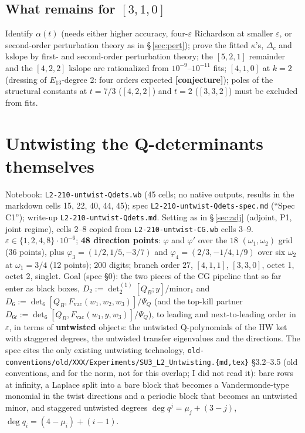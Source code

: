 \documentclass[10pt]{article}
\newcommand{\nb}[1]{\texttt{#1}}
\begin{document}
\subsection{What remains for $[3,1,0]$}\label{sec:a310open}

Identify $\alpha(t)$ (needs either higher accuracy, four-$\varepsilon$ Richardson at smaller $\varepsilon$, or second-order perturbation theory as in \S\,\ref{sec:pert}); prove the fitted $\kappa$'s, $\Delta_c$ and $\mathrm{kslope}$ by first- and second-order perturbation theory; the $[5,2,1]$ remainder and the $[4,2,2]$ $\mathrm{kslope}$ are rationalized from $10^{-9}$--$10^{-11}$ fits; $[4,1,0]$ at $k=2$ (dressing of $E_{13}$-degree 2: four orders expected \textbf{[conjecture]}); poles of the structural constants at $t=7/3$ ($[4,2,2]$) and $t=2$ ($[3,3,2]$) must be excluded from fits.

\section{Untwisting the Q-determinants themselves}\label{sec:dets}

Notebook: \nb{L2-\allowbreak{}210-\allowbreak{}untwist-\allowbreak{}Qdets.\allowbreak{}wb} (45 cells; no native outputs, results in the markdown cells 15, 22, 40, 44, 45); spec \nb{L2-\allowbreak{}210-\allowbreak{}untwist-\allowbreak{}Qdets-\allowbreak{}spec.\allowbreak{}md} (``Spec C1''); write-up \nb{L2-\allowbreak{}210-\allowbreak{}untwist-\allowbreak{}Qdets.\allowbreak{}md}. Setting as in \S\,\ref{sec:adj} (adjoint, P1, joint regime), cells 2--8 copied from \nb{L2-\allowbreak{}210-\allowbreak{}untwist-\allowbreak{}CG.\allowbreak{}wb} cells 3--9. $\varepsilon\in\{1,2,4,8\}\cdot10^{-6}$; \textbf{48 direction points}: $\varphi$ and $\varphi'$ over the $18$ $(\omega_1,\omega_2)$ grid (36 points), plus $\varphi_3=(1/2,1/5,-3/7)$ and $\varphi_4=(2/3,-1/4,1/9)$ over six $\omega_2$ at $\omega_1=3/4$ (12 points); 200 digits; branch order $27$, $[4,1,1]$, $[3,3,0]$, octet 1, octet 2, singlet. Goal (spec \S{}0): the two pieces of the CG pipeline that so far enter as black boxes, $D_2:=\det_2^{(1)}[Q_B;y]/\mathrm{minor}_1$ and $D_6:=\det_6[Q_B,F_{\mathrm{vac}}(w_1,w_2,w_3)]/\Psi_Q$ (and the top-kill partner $D_{6t}:=\det_6[Q_B,F_{\mathrm{vac}}(w_1,y,w_3)]/\Psi_Q$), to leading and next-to-leading order in $\varepsilon$, in terms of \textbf{untwisted} objects: the untwisted Q-polynomials of the HW ket with staggered degrees, the untwisted transfer eigenvalues and the directions. The spec cites the only existing untwisting technology, \nb{old-\allowbreak{}conventions/\allowbreak{}old/\allowbreak{}XXX/\allowbreak{}Experiments/\allowbreak{}SU3\_\allowbreak{}L2\_\allowbreak{}Untwisting.\allowbreak{}\{md,tex\}} \S{}3.2--3.5 (old conventions, and for the norm, not for this overlap; I did not read it): bare rows at infinity, a Laplace split into a bare block that becomes a Vandermonde-type monomial in the twist directions and a periodic block that becomes an untwisted minor, and staggered untwisted degrees $\deg q^j=\mu_j+(3-j)$, $\deg q_i=(4-\mu_i)+(i-1)$.
\end{document}
